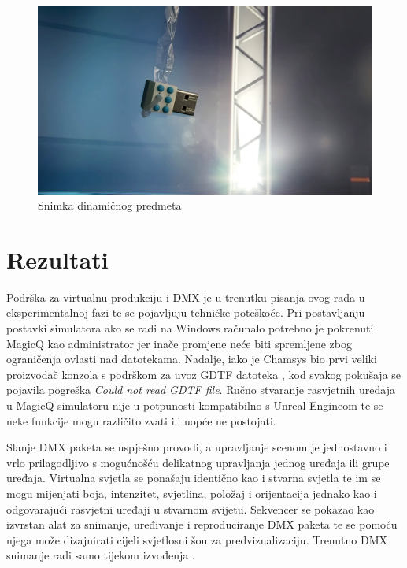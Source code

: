 \documentclass[times, utf8, zavrsni, numeric]{fer}
\begin{document}
\begin{figure}[htp]
	\centering
	\includegraphics[width=\linewidth]{slika 7-3.png}
	\caption{Snimka dinamičnog predmeta}
	\label{fig:slika 7-3}
\end{figure}

\chapter{Rezultati}
Podrška za virtualnu produkciju i DMX je u trenutku pisanja ovog rada u eksperimentalnoj fazi te se pojavljuju tehničke poteškoće. Pri postavljanju postavki simulatora ako se radi na Windows računalo potrebno je pokrenuti MagicQ kao administrator jer inače promjene neće biti spremljene zbog ograničenja ovlasti nad datotekama. Nadalje, iako je Chamsys bio prvi veliki proizvođač konzola s podrškom za uvoz GDTF datoteka \cite{MagicQ_GDTF}, kod svakog pokušaja se pojavila pogreška \emph{Could not read GDTF file}. Ručno stvaranje rasvjetnih uređaja u MagicQ simulatoru nije u potpunosti kompatibilno s Unreal Engineom te se neke funkcije mogu različito zvati ili uopće ne postojati. \newline

Slanje DMX paketa se uspješno provodi, a upravljanje scenom je jednostavno i vrlo prilagodljivo s mogućnošću delikatnog upravljanja jednog uređaja ili grupe uređaja. Virtualna svjetla se ponašaju identično kao i stvarna svjetla te im se mogu mijenjati boja, intenzitet, svjetlina, položaj i orijentacija jednako kao i odgovarajući rasvjetni uređaji u stvarnom svijetu. Sekvencer se pokazao kao izvrstan alat za snimanje, uređivanje i reproduciranje DMX paketa te se pomoću njega može dizajnirati cijeli svjetlosni šou za predvizualizaciju. Trenutno DMX snimanje radi samo tijekom izvođenja \cite{dmx_tracks}. \newline
\end{document}
